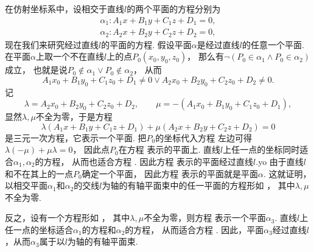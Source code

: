 在仿射坐标系中，设相交于直线\(l\)的两个平面的方程分别为\begin{equation*}
	\begin{split}
		\alpha_1: A_1 x + B_1 y + C_1 z + D_1 = 0, \\
		\alpha_2: A_2 x + B_2 y + C_2 z + D_2 = 0,
	\end{split}
\end{equation*}
现在我们来研究经过直线\(l\)的平面的方程.
假设平面\(\alpha\)是经过直线\(l\)的任意一个平面.
在平面\(\alpha\)上取一个不在直线\(l\)上的点\(P_0(x_0,y_0,z_0)\)，
那么有\(\neg(P_0 \in \alpha_1 \land P_0 \in \alpha_2)\)成立，
也就是说\(P_0 \notin \alpha_1 \lor P_0 \notin \alpha_2\)，
从而\begin{equation*}
	A_1 x_0 + B_1 y_0 + C_1 z_0 + D_1 \neq 0
	\lor
	A_2 x_0 + B_2 y_0 + C_2 z_0 + D_2 \neq 0.
\end{equation*}
记\begin{equation*}
	\lambda = A_2 x_0 + B_2 y_0 + C_2 z_0 + D_2, \qquad
	\mu = -(A_1 x_0 + B_1 y_0 + C_1 z_0 + D_1),
\end{equation*}
显然\(\lambda,\mu\)不全为零，于是方程
\begin{equation}\label{equation:解析几何.由两个相交平面确定的有轴平面束方程}
	\lambda	(A_1 x + B_1 y + C_1 z + D_1)
	+ \mu	(A_2 x + B_2 y + C_2 z + D_2) = 0
\end{equation}
是三元一次方程，它表示一个平面.
把\(P_0\)的坐标代入方程 
左边可得\(\lambda(-\mu)+\mu\lambda=0\)，
因此点\(P_0\)在方程  表示的平面上.
直线\(l\)上任一点的坐标同时适合\(\alpha_1,\alpha_2\)的方程，
从而也适合方程 .
因此方程 
表示的平面经过直线\(l\).yo
由于直线\(l\)和不在其上的一点\(P_0\)确定一个平面，
因此方程 
表示的平面就是平面\(\alpha\).
这就证明，以相交平面\(\alpha_1\)和\(\alpha_2\)的交线\(l\)为轴的有轴平面束中的任一平面的方程形如 ，
其中\(\lambda,\mu\)不全为零.

反之，设有一个方程形如 ，
其中\(\lambda,\mu\)不全为零，则方程 
表示一个平面\(\alpha_3\).
直线\(l\)上任一点的坐标适合\(\alpha_1\)的方程和\(\alpha_2\)的方程，
从而适合方程 .
因此，平面\(\alpha_3\)经过直线\(l\)，从而\(\alpha_3\)属于以\(l\)为轴的有轴平面束.

